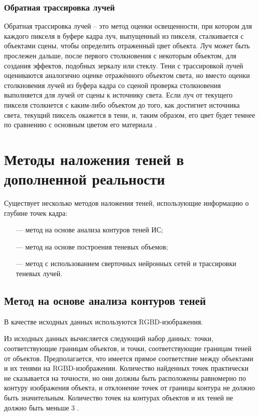\subsubsection*{Обратная трассировка лучей}

Обратная трассировка лучей -- это метод оценки освещенности, при котором для каждого пикселя в буфере кадра луч, выпущенный из пикселя, сталкивается с объектами сцены, чтобы определить отраженный цвет объекта. Луч может быть прослежен дальше, после первого столкновения с некоторым объектом, для создания эффектов, подобных зеркалу или стеклу. Тени с трассировкой лучей оцениваются аналогично оценке отражённого объектом света, но вместо оценки столкновения лучей из буфера кадра со сценой проверка столкновения выполняется для лучей от сцены к источнику света. Если луч от текущего пикселя столкнется с каким-либо объектом до того, как достигнет источника света, текущий пиксель окажется в тени, и, таким образом, его цвет будет темнее по сравнению с основным цветом его материала \cite{engel2008programming}.

\section{Методы наложения теней в дополненной реальности}

Существует несколько методов наложения теней, использующие информацию о глубине точек кадра:

\begin{itemize}
	\item[---] метод на основе анализа контуров теней ИС;
	\item[---] метод на основе построения теневых объемов;
	\item[---] метод с использованием сверточных нейронных сетей и трассировки теневых лучей.
\end{itemize}

\subsection{Метод на основе анализа контуров теней}

В качестве исходных данных используются RGBD-изображения.

Из исходных данных вычисляется следующий набор данных: точки, соответствующие границам объектов, и точки, соответствующие границам теней от объектов. Предполагается, что имеется прямое соответствие между объектами и их тенями на RGBD-изображении. Количество найденных точек практически не сказывается на точности, но они должны быть расположены равномерно по контуру изображения объекта, и отклонение точек от границы контура не должно быть значительным. Количество точек на контурах объектов и их теней не должно быть меньше 3 \cite{shadow_contours_method}.

